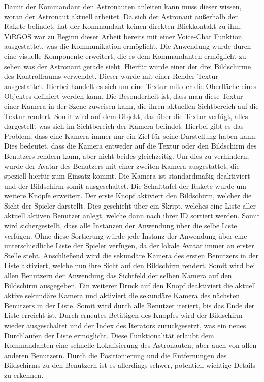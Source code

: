 Damit der Kommandant den Astronauten anleiten kann muss dieser wissen, woran der Astronaut aktuell arbeitet. Da sich der Astronaut außerhalb der Rakete befindet, hat der Kommandant keinen direkten Blickkontakt zu ihm. ViRGOS war zu Beginn dieser Arbeit bereits mit einer Voice-Chat Funktion ausgestattet, was die Kommunikation ermöglicht. Die Anwendung wurde durch eine visuelle Komponente erweitert, die es dem Kommandanten ermöglicht zu sehen was der Astronaut gerade sieht. Hierfür wurde einer der drei Bildschirme des Kontrollraums verwendet. Dieser wurde mit einer Render-Textur ausgestattet. Hierbei handelt es sich um eine Textur mit der die Oberfläche eines Objektes definiert werden kann. Die Besonderheit ist, dass man diese Textur einer Kamera in der Szene zuweisen kann, die ihren aktuellen Sichtbereich auf die Textur rendert. Somit wird auf dem Objekt, das über die Textur verfügt, alles dargestellt was sich im Sichtbereich der Kamera befindet. Hierbei gibt es das Problem, dass eine Kamera immer nur ein Ziel für seine Darstellung haben kann. Dies bedeutet, dass die Kamera entweder auf die Textur oder den Bildschirm des Benutzers rendern kann, aber nicht beides gleichzeitig. Um dies zu verhindern, wurde der Avatar des Benutzers mit einer zweiten Kamera ausgestattet, die speziell hierfür zum Einsatz kommt. Die Kamera ist standardmäßig deaktiviert und der Bildschirm somit ausgeschaltet. Die Schalttafel der Rakete wurde um weitere Knöpfe erweitert. Der erste Knopf aktiviert den Bildschirm, welcher die Sicht der Spieler darstellt. Dies geschieht über ein Skript, welches eine Liste aller aktuell aktiven Benutzer anlegt, welche dann nach ihrer ID sortiert werden. Somit wird sichergestellt, dass alle Instanzen der Anwendung über die selbe Liste verfügen. Ohne diese Sortierung würde jede Instanz der Anwendung über eine unterschiedliche Liste der Spieler verfügen, da der lokale Avatar immer an erster Stelle steht. Anschließend wird die sekundäre Kamera des ersten Benutzers in der Liste aktiviert, welche nun ihre Sicht auf den Bildschirm rendert. Somit wird bei allen Benutzern der Anwendung das Sichtfeld der selben Kamera auf den Bildschirm ausgegeben. Ein weiterer Druck auf den Knopf deaktiviert die aktuell aktive sekundäre Kamera und aktiviert die sekundäre Kamera des nächsten Benutzers in der Liste. Somit wird durch alle Benutzer iteriert, bis das Ende der Liste erreicht ist. Durch erneutes Betätigen des Knopfes wird der Bildschirm wieder ausgeschaltet und der Index des Iterators zurückgesetzt, was ein neues Durchlaufen der Liste ermöglicht. Diese Funktionalität erlaubt dem Kommandanten eine schnelle Lokalisierung des Astronauten, aber auch von allen anderen Benutzern. Durch die Positionierung und die Entfernungen des Bildschirms zu den Benutzern ist es allerdings schwer, potentiell wichtige Details zu erkennen.\newline

